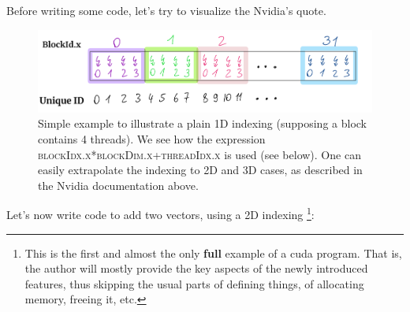Before writing some code, let's try to visualize the Nvidia's quote.
\begin{figure}[H]
   \centering
   \includegraphics[scale=0.25]{pngs/tindexing.png}
   \caption{Simple example to illustrate a plain 1D indexing (supposing a block 
   contains 4 threads). We see how the expression \textsc{blockIdx.x*blockDim.x+threadIdx.x} is used (see below). 
   One can easily extrapolate the indexing to 2D and 3D cases, as described in the Nvidia documentation above.
   }
   \label{fig:tindexing}
\end{figure}
Let's now write code to add two vectors, using a 2D indexing \footnote{This is the first and almost the only \textbf{full} example of a cuda program. 
That is, the author will mostly provide the key aspects of the newly introduced features, thus skipping the usual parts of defining things, of allocating 
memory, freeing it, etc.}: 

